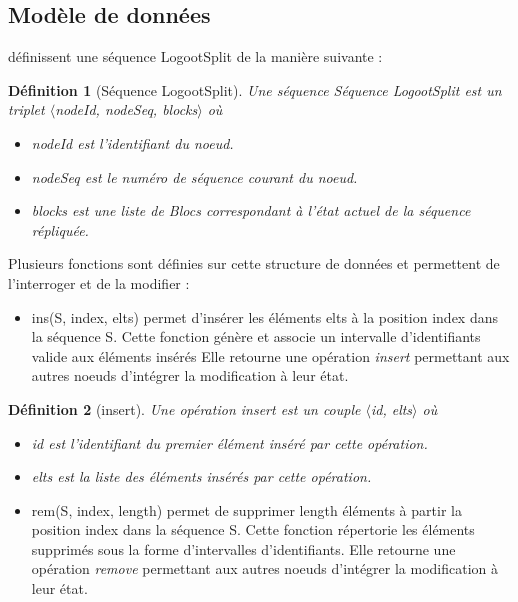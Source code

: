\documentclass[12pt]{thesul}
\newtheorem{definition}{Définition}
\begin{document}
\subsection{Modèle de données}

\textcite{2013-logootsplit} définissent une séquence LogootSplit de la manière suivante :

\begin{definition}[Séquence LogootSplit]
  \label{def:logootsplit}
  Une séquence \emph{Séquence LogootSplit} est un triplet $\langle$nodeId, nodeSeq, blocks$\rangle$ où
  \begin{itemize}
    \item nodeId est l'identifiant du noeud.
    \item nodeSeq est le numéro de séquence courant du noeud.
    \item blocks est une liste de Blocs correspondant à l'état actuel de la séquence répliquée.
  \end{itemize}
\end{definition}

Plusieurs fonctions sont définies sur cette structure de données et permettent de l'interroger et de la modifier :

\begin{itemize}
  \item ins(S, index, elts) permet d'insérer les éléments elts à la position index dans la séquence S.
    Cette fonction génère et associe un intervalle d'identifiants valide aux éléments insérés
    Elle retourne une opération \emph{insert} permettant aux autres noeuds d'intégrer la modification à leur état.
\end{itemize}

\begin{definition}[insert]
  Une opération \emph{insert} est un couple $\langle$id, elts$\rangle$ où
  \begin{itemize}
    \item id est l'identifiant du premier élément inséré par cette opération.
    \item elts est la liste des éléments insérés par cette opération.
  \end{itemize}
\end{definition}

\begin{itemize}
  \item rem(S, index, length) permet de supprimer length éléments à partir la position index dans la séquence S.
  Cette fonction répertorie les éléments supprimés sous la forme d'intervalles d'identifiants.
  Elle retourne une opération \emph{remove} permettant aux autres noeuds d'intégrer la modification à leur état.
\end{itemize}
\end{document}
